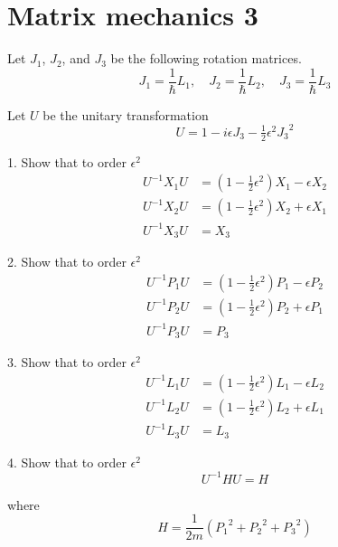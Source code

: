 

\section*{Matrix mechanics 3}

Let $J_1$, $J_2$, and $J_3$ be the following rotation matrices.
\begin{equation*}
J_1=\frac{1}{\hbar}L_1,\quad
J_2=\frac{1}{\hbar}L_2,\quad
J_3=\frac{1}{\hbar}L_3
\end{equation*}

Let $U$ be the unitary transformation
\begin{equation*}
U=1-i\epsilon J_3-\tfrac{1}{2}\epsilon^2{J_3}^2
\end{equation*}

1. Show that to order $\epsilon^2$
\begin{align*}
U^{-1}X_1U&=\left(1-\tfrac{1}{2}\epsilon^2\right)X_1-\epsilon X_2
\\
U^{-1}X_2U&=\left(1-\tfrac{1}{2}\epsilon^2\right)X_2+\epsilon X_1
\\
U^{-1}X_3U&=X_3
\end{align*}

2. Show that to order $\epsilon^2$
\begin{align*}
U^{-1}P_1U&=\left(1-\tfrac{1}{2}\epsilon^2\right)P_1-\epsilon P_2
\\
U^{-1}P_2U&=\left(1-\tfrac{1}{2}\epsilon^2\right)P_2+\epsilon P_1
\\
U^{-1}P_3U&=P_3
\end{align*}

3. Show that to order $\epsilon^2$
\begin{align*}
U^{-1}L_1U&=\left(1-\tfrac{1}{2}\epsilon^2\right)L_1-\epsilon L_2
\\
U^{-1}L_2U&=\left(1-\tfrac{1}{2}\epsilon^2\right)L_2+\epsilon L_1
\\
U^{-1}L_3U&=L_3
\end{align*}

4. Show that to order $\epsilon^2$
\begin{equation*}
U^{-1}HU=H
\end{equation*}

where
\begin{equation*}
H=\frac{1}{2m}\left({P_1}^2+{P_2}^2+{P_3}^2\right)
\end{equation*}


